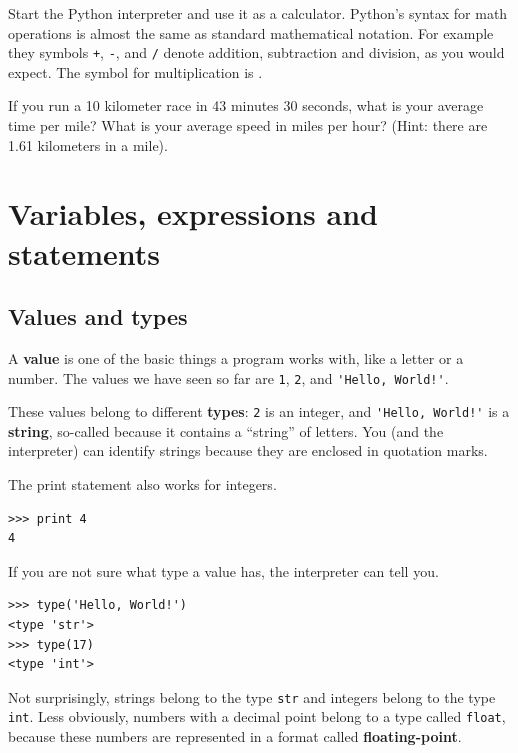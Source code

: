 \documentclass[10pt]{book}
\begin{document}
\begin{ex}
Start the Python interpreter and use it as a calculator.
Python's syntax for math operations is almost the same as
standard mathematical notation.  For example they symbols
{\tt +}, {\tt -}, and {\tt /} denote addition, subtraction
and division, as you would expect.  The symbol for
multiplication is {\tt *}.

If you run a 10 kilometer race in 43 minutes 30 seconds, what is your
average time per mile?  What is your average speed in miles per hour?
(Hint: there are 1.61 kilometers in a mile).


\end{ex}




\chapter{Variables, expressions and statements}

\section{Values and types}

A {\bf value} is one of the basic things a program works with,
like a letter or a
number.  The values we have seen so far
are {\tt 1}, {\tt 2}, and
\verb"'Hello, World!'".

These values belong to different {\bf types}:
{\tt 2} is an integer, and \verb"'Hello, World!'" is a {\bf string},
so-called because it contains a ``string'' of letters.
You (and the interpreter) can identify
strings because they are enclosed in quotation marks.


The print statement also works for integers.

\beforeverb
\begin{verbatim}
>>> print 4
4
\end{verbatim}
\afterverb
%
If you are not sure what type a value has, the interpreter can tell you.

\beforeverb
\begin{verbatim}
>>> type('Hello, World!')
<type 'str'>
>>> type(17)
<type 'int'>
\end{verbatim}
\afterverb
%
Not surprisingly, strings belong to the type {\tt str} and
integers belong to the type {\tt int}.  Less obviously, numbers
with a decimal point belong to a type called {\tt float},
because these numbers are represented in a
format called {\bf floating-point}.
\end{document}
